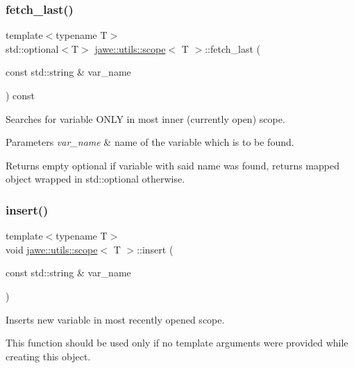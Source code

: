 \subsubsection{\texorpdfstring{fetch\+\_\+last()}{fetch\_last()}}
{\footnotesize\ttfamily template$<$typename T$>$ \\
std\+::optional$<$T$>$ \hyperlink{classjawe_1_1utils_1_1scope}{jawe\+::utils\+::scope}$<$ T $>$\+::fetch\+\_\+last (\begin{DoxyParamCaption}\item[{const std\+::string \&}]{var\+\_\+name }\end{DoxyParamCaption}) const\hspace{0.3cm}{\ttfamily [inline]}}

Searches for variable O\+N\+LY in most inner (currently open) scope.


\begin{DoxyParams}{Parameters}
{\em var\+\_\+name} & name of the variable which is to be found. \\
\hline
\end{DoxyParams}
\begin{DoxyReturn}{Returns}
empty optional if variable with said name was found, returns mapped object wrapped in std\+::optional otherwise. 
\end{DoxyReturn}
\mbox{\label{classjawe_1_1utils_1_1scope_ab64ac5cc3bce5c9909aff566ac50fac0}} 
\subsubsection{\texorpdfstring{insert()}{insert()}\hspace{0.1cm}{\footnotesize\ttfamily [1/2]}}
{\footnotesize\ttfamily template$<$typename T$>$ \\
void \hyperlink{classjawe_1_1utils_1_1scope}{jawe\+::utils\+::scope}$<$ T $>$\+::insert (\begin{DoxyParamCaption}\item[{const std\+::string \&}]{var\+\_\+name }\end{DoxyParamCaption})\hspace{0.3cm}{\ttfamily [inline]}}

Inserts new variable in most recently opened scope.

This function should be used only if no template arguments were provided while creating this object.


